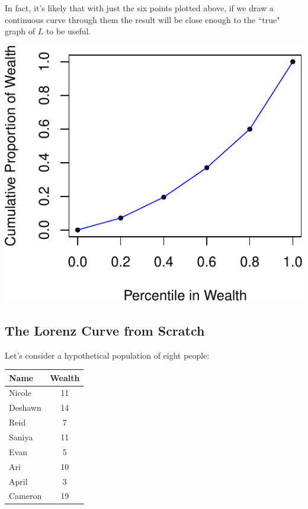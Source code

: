 \documentclass[12pt]{memoir}\usepackage[]{graphicx}\usepackage[table]{xcolor}
\begin{document}
In fact, it's likely that with just the six points plotted above, if we draw a
continuous curve through them the result will be close enough to the ``true" graph
of $L$ to be useful.  


\begin{center}
\includegraphics{figure/Lorenz2-1.pdf}
\end{center}

\subsection{The Lorenz Curve from Scratch}

Let's consider a hypothetical population of eight people: 
\medskip
\begin{center}
\begin{tabular}{lc}
\toprule
Name & Wealth \\ \midrule
Nicole & 11 \\ \midrule
Deshawn & 14 \\ \midrule
Reid    & 7 \\ \midrule
Saniya  & 11 \\ \midrule
Evan    & 5 \\ \midrule
Ari     & 10 \\ \midrule
April   & 3 \\ \midrule
Cameron & 19 \\ \bottomrule
\end{tabular}
\end{center}
\medskip
\end{document}
